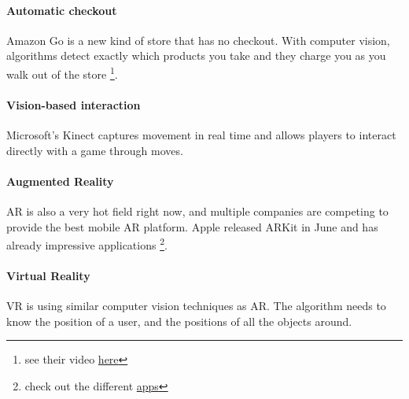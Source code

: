 \documentclass{article}
\begin{document}
\paragraph{Automatic checkout}
Amazon Go is a new kind of store that has no checkout. With computer vision, algorithms detect exactly which products you take and they charge you as you walk out of the store \footnote{see their video \href{https://www.amazon.com/b?node=16008589011}{here}}.

\paragraph{Vision-based interaction}
Microsoft's Kinect captures movement in real time and allows players to interact directly with a game through moves.

\paragraph{Augmented Reality}
AR is also a very hot field right now, and multiple companies are competing to provide the best mobile AR platform. Apple released ARKit in June and has already impressive applications \footnote{check out the different \href{http://www.madewitharkit.com}{apps}}.

\paragraph{Virtual Reality}
VR is using similar computer vision techniques as AR. The algorithm needs to know the position of a user, and the positions of all the objects around.





\small


\end{document}
